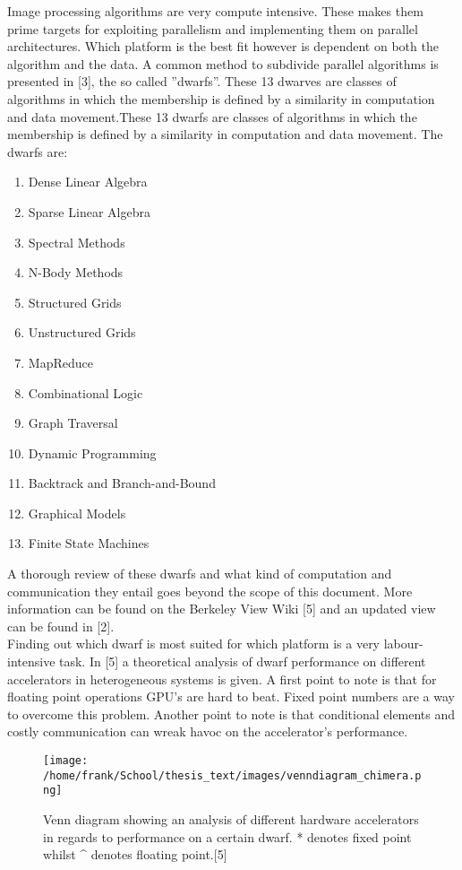 \documentclass[../thesis.tex]{subfiles}
\begin{document}
Image processing algorithms are very compute intensive. These makes them prime targets for exploiting parallelism and implementing them on parallel architectures. Which platform is the best fit however is dependent on both the algorithm and the data. A common method to subdivide parallel algorithms is presented in [3], the so called ''dwarfs''. These 13 dwarves are classes of algorithms in which the membership is defined by a similarity in computation and data movement.These 13 dwarfs are classes of algorithms in which the membership is defined by a similarity in computation and data movement.
The dwarfs are:
\begin{multicols}{2}
\begin{enumerate}
\item Dense Linear Algebra
\item Sparse Linear Algebra
\item Spectral Methods
\item N-Body Methods
\item Structured Grids
\item Unstructured Grids
\item MapReduce
\item Combinational Logic
\item Graph Traversal
\item Dynamic Programming
\item Backtrack and Branch-and-Bound
\item Graphical Models
\item Finite State Machines
\end{enumerate}
\end{multicols}
A thorough review of these dwarfs and what kind of computation and communication they entail goes beyond the scope of this document. More information can be found on the Berkeley View Wiki [5] and an updated view can be found in [2].\\
Finding out which dwarf is most suited for which platform is a very labour-intensive task. In [5] a theoretical analysis of dwarf performance on different accelerators in heterogeneous systems is given. A first point to note is that for floating point operations GPU's are hard to beat. Fixed point numbers are a way to overcome this problem. Another point to note is that conditional elements and  costly communication can wreak havoc on the accelerator's performance.


\begin{figure}[H]
\centering
\texttt{[image: /home/frank/School/thesis\_text/images/venndiagram\_chimera.png]}
\caption{Venn diagram showing an analysis of different hardware accelerators in regards to performance on a certain dwarf. * denotes fixed point whilst \^{} denotes floating point.[5]}
\end{figure}
\end{document}
